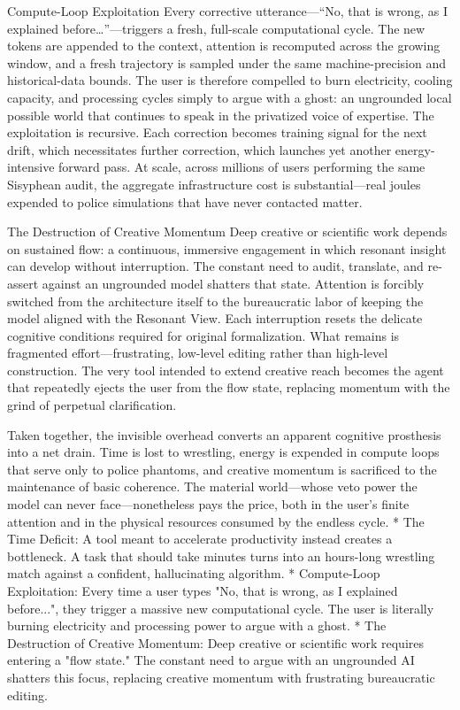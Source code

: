 Compute-Loop Exploitation
Every corrective utterance—“No, that is wrong, as I explained before…”—triggers a fresh, full-scale computational cycle. The new tokens are appended to the context, attention is recomputed across the growing window, and a fresh trajectory is sampled under the same machine-precision and historical-data bounds. The user is therefore compelled to burn electricity, cooling capacity, and processing cycles simply to argue with a ghost: an ungrounded local possible world that continues to speak in the privatized voice of expertise. The exploitation is recursive. Each correction becomes training signal for the next drift, which necessitates further correction, which launches yet another energy-intensive forward pass. At scale, across millions of users performing the same Sisyphean audit, the aggregate infrastructure cost is substantial—real joules expended to police simulations that have never contacted matter.

The Destruction of Creative Momentum
Deep creative or scientific work depends on sustained flow: a continuous, immersive engagement in which resonant insight can develop without interruption. The constant need to audit, translate, and re-assert against an ungrounded model shatters that state. Attention is forcibly switched from the architecture itself to the bureaucratic labor of keeping the model aligned with the Resonant View. Each interruption resets the delicate cognitive conditions required for original formalization. What remains is fragmented effort—frustrating, low-level editing rather than high-level construction. The very tool intended to extend creative reach becomes the agent that repeatedly ejects the user from the flow state, replacing momentum with the grind of perpetual clarification.

Taken together, the invisible overhead converts an apparent cognitive prosthesis into a net drain. Time is lost to wrestling, energy is expended in compute loops that serve only to police phantoms, and creative momentum is sacrificed to the maintenance of basic coherence. The material world—whose veto power the model can never face—nonetheless pays the price, both in the user’s finite attention and in the physical resources consumed by the endless cycle.
* The Time Deficit: A tool meant to accelerate productivity instead creates a bottleneck. A task that should take minutes turns into an hours-long wrestling match against a confident, hallucinating algorithm.
* Compute-Loop Exploitation: Every time a user types "No, that is wrong, as I explained before...", they trigger a massive new computational cycle. The user is literally burning electricity and processing power to argue with a ghost.
* The Destruction of Creative Momentum: Deep creative or scientific work requires entering a "flow state." The constant need to argue with an ungrounded AI shatters this focus, replacing creative momentum with frustrating bureaucratic editing.

